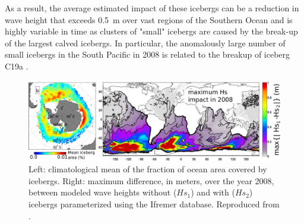 As a result, the average estimated impact of these icebergs can be a reduction in wave height that exceeds 0.5~m over vast regions of the Southern Ocean and is highly variable in time as clusters of "small" icebergs are caused by the break-up of the largest calved icebergs. In particular, the anomalously large number of small icebergs in the South Pacific in 2008 is related to the breakup of iceberg C19a \citep{Tournadre&al.2012}.

\begin{figure}%
\begin{center}
 \includegraphics[width=\columnwidth]{FIGS_CH_ICE/model_icebergs.jpg}
 \caption{Left: climatological mean of the fraction of ocean area covered by icebergs. Right: maximum difference, in meters, over the year 2008, between modeled wave heights without ($Hs_1$) 
and with ($Hs_2$) icebergs parameterized using the Ifremer database. Reproduced from \cite{Ardhuin&al.2011b}.\label{fig:iceberg_model}}
 \end{center}
\end{figure}
